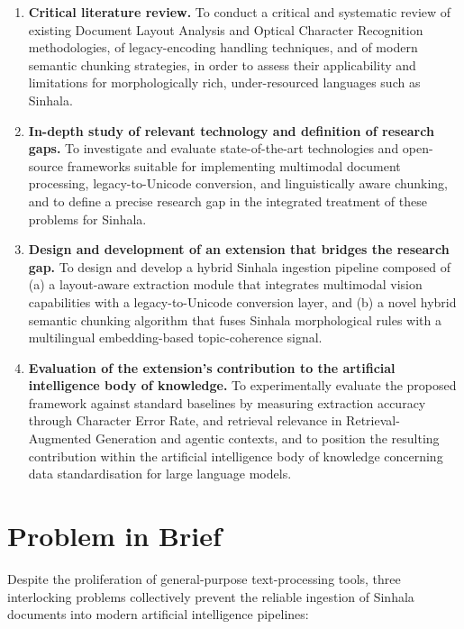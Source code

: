 \documentclass[12pt,a4paper,oneside]{report}
\begin{document}
\begin{enumerate}[label=(\roman*), leftmargin=2em]
    \item \textbf{Critical literature review.} To conduct a critical and systematic review of existing Document Layout Analysis and Optical Character Recognition methodologies, of legacy-encoding handling techniques, and of modern semantic chunking strategies, in order to assess their applicability and limitations for morphologically rich, under-resourced languages such as Sinhala.

    \item \textbf{In-depth study of relevant technology and definition of research gaps.} To investigate and evaluate state-of-the-art technologies and open-source frameworks suitable for implementing multimodal document processing, legacy-to-Unicode conversion, and linguistically aware chunking, and to define a precise research gap in the integrated treatment of these problems for Sinhala.

    \item \textbf{Design and development of an extension that bridges the research gap.} To design and develop a hybrid Sinhala ingestion pipeline composed of (a) a layout-aware extraction module that integrates multimodal vision capabilities with a legacy-to-Unicode conversion layer, and (b) a novel hybrid semantic chunking algorithm that fuses Sinhala morphological rules with a multilingual embedding-based topic-coherence signal.

    \item \textbf{Evaluation of the extension's contribution to the artificial intelligence body of knowledge.} To experimentally evaluate the proposed framework against standard baselines by measuring extraction accuracy through Character Error Rate, and retrieval relevance in Retrieval-Augmented Generation and agentic contexts, and to position the resulting contribution within the artificial intelligence body of knowledge concerning data standardisation for large language models.
\end{enumerate}

\section{Problem in Brief}
\label{sec:problem-brief}
Despite the proliferation of general-purpose text-processing tools, three interlocking problems collectively prevent the reliable ingestion of Sinhala documents into modern artificial intelligence pipelines:
\end{document}
